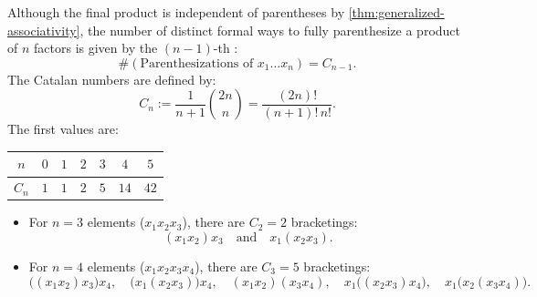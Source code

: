 \begin{content}

\begin{steps}
Although the final product is independent of parentheses by \cref{thm:generalized-associativity}, the number of distinct formal ways to fully parenthesize a product of $n$ factors is given by the $(n-1)$-th :
\[
\#(\text{Parenthesizations of } x_1 \dots x_n) = C_{n-1}.
\]
The Catalan numbers are defined by:
\begin{equation}\label{eq:catalan-formula}
C_n := \frac{1}{n+1} \binom{2n}{n} = \frac{(2n)!}{(n+1)! \, n!}.
\end{equation}
The first values are:
\begin{center}
\begin{tabular}{c c c c c c c}
\toprule
$n$ & $0$ & $1$ & $2$ & $3$ & $4$ & $5$ \\
\midrule
$C_n$ & $1$ & $1$ & $2$ & $5$ & $14$ & $42$ \\
\bottomrule
\end{tabular}
\end{center}
\begin{itemize}
    \item For $n = 3$ elements ($x_1 x_2 x_3$), there are $C_2 = 2$ bracketings:
    \[
    (x_1 x_2) x_3 \quad \text{and} \quad x_1 (x_2 x_3).
    \]
    \item For $n = 4$ elements ($x_1 x_2 x_3 x_4$), there are $C_3 = 5$ bracketings:
    \[
    \bigl((x_1 x_2) x_3\bigr) x_4, \quad \bigl(x_1 (x_2 x_3)\bigr) x_4, \quad (x_1 x_2)(x_3 x_4), \quad x_1 \bigl((x_2 x_3) x_4\bigr), \quad x_1 \bigl(x_2 (x_3 x_4)\bigr).
    \]
\end{itemize}
\end{steps}

\end{content}

